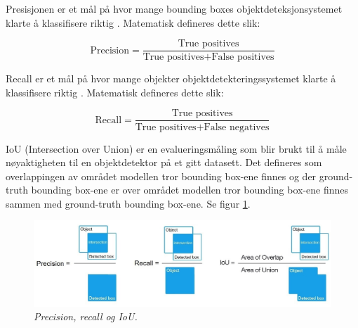 


Presisjonen er et mål på hvor mange bounding boxes objektdeteksjonsystemet klarte å klassifisere riktig \cite{Siddiqui m.fl. 207 s. 383}. Matematisk defineres dette slik:

\begin{equation}
\text{Precision} = \frac{\text{True positives}}{\text{True positives} + \text{False positives}}
\end{equation}


Recall er et mål på hvor mange objekter objektdetekteringssystemet klarte å klassifisere riktig \cite{Siddiqui m.fl. 207 s. 383}. Matematisk defineres dette slik:

\begin{equation}
\text{Recall} = \frac{\text{True positives}}{\text{True positives} + \text{False negatives}}
\end{equation}

IoU (Intersection over Union) er en evalueringsmåling som blir brukt til å måle nøyaktigheten til en objektdetektor på et gitt datasett. Det defineres som overlappingen av området modellen tror bounding box-ene finnes og der ground-truth bounding box-ene er over området modellen tror bounding box-ene finnes sammen med ground-truth bounding box-ene. Se figur \ref{fig:precision}. \cite{Bochkovskiy 2020}

\begin{figure}[H]
\begin{center} 
\includegraphics[scale=0.45]{figures/precision}
\caption{\small \sl Precision, recall og IoU. \cite{Bochkovskiy 2020} \label{fig:precision}}
\end{center}
\end{figure}

